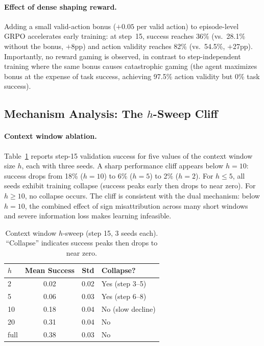 \documentclass[10pt]{article}
\begin{document}
\paragraph{Effect of dense shaping reward.}
Adding a small valid-action bonus ($+0.05$ per valid action) to episode-level GRPO accelerates early training: at step~15, success reaches 36\% (vs.\ 28.1\% without the bonus, $+$8pp) and action validity reaches 82\% (vs.\ 54.5\%, $+$27pp). Importantly, no reward gaming is observed, in contrast to step-independent training where the same bonus causes catastrophic gaming (the agent maximizes bonus at the expense of task success, achieving 97.5\% action validity but 0\% task success).

\subsection{Mechanism Analysis: The $h$-Sweep Cliff}

\paragraph{Context window ablation.}
Table~\ref{tab:hsweep} reports step-15 validation success for five values of the context window size $h$, each with three seeds. A sharp performance cliff appears below $h = 10$: success drops from 18\% ($h{=}10$) to 6\% ($h{=}5$) to 2\% ($h{=}2$). For $h \leq 5$, all seeds exhibit training collapse (success peaks early then drops to near zero). For $h \geq 10$, no collapse occurs. The cliff is consistent with the dual mechanism: below $h{=}10$, the combined effect of sign misattribution across many short windows and severe information loss makes learning infeasible.

\begin{table}[h]
\centering
\caption{Context window $h$-sweep (step 15, 3 seeds each). ``Collapse'' indicates success peaks then drops to near zero.}
\label{tab:hsweep}
\begin{tabular}{lccl}
\toprule
$h$ & Mean Success & Std & Collapse? \\
\midrule
2    & 0.02 & 0.02 & Yes (step 3--5) \\
5    & 0.06 & 0.03 & Yes (step 6--8) \\
10   & 0.18 & 0.04 & No (slow decline) \\
20   & 0.31 & 0.04 & No \\
full & 0.38 & 0.03 & No \\
\bottomrule
\end{tabular}
\end{table}
\end{document}
